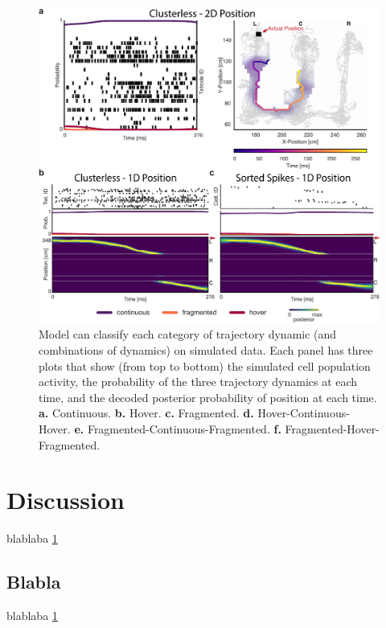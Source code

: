 \documentclass[times, twoside, watermark]{zHenriquesLab-StyleBioRxiv}
\begin{document}
\begin{figure}%
\centering
\includegraphics[width=1.0\linewidth]{figures/Figure3.pdf}
\caption{Model can classify each category of trajectory dynamic (and combinations of dynamics) on simulated data. Each panel has three plots that show (from top to bottom) the simulated cell population activity, the probability of the three trajectory dynamics at each time, and the decoded posterior probability of position at each time. \textbf{a.} Continuous. \textbf{b.} Hover. \textbf{c.} Fragmented. \textbf{d.} Hover-Continuous-Hover. \textbf{e.} Fragmented-Continuous-Fragmented. \textbf{f.} Fragmented-Hover-Fragmented.}
\label{fig:computerNo}
\end{figure}

\section*{Discussion}

blablaba \ref{fig:computerNo} 
\blindtext

\subsection*{Blabla} 
\blindtext


blablaba \ref{fig:computerNo}
\blindtext

\begin{acknowledgements}
\blindtext
\end{acknowledgements}
\end{document}
